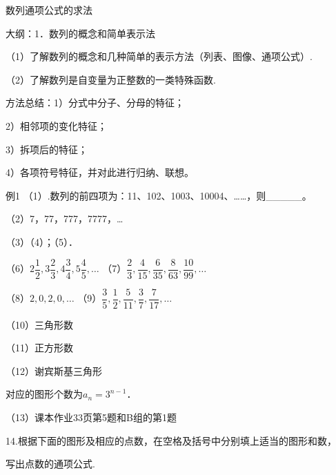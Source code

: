 
数列通项公式的求法\par
大纲：1．数列的概念和简单表示法\par
（1）了解数列的概念和几种简单的表示方法（列表、图像、通项公式）.\par
（2）了解数列是自变量为正整数的一类特殊函数.\par
\par\bigskip{}\par
方法总结：1）分式中分子、分母的特征；\par
2）相邻项的变化特征；\par
3）拆项后的特征；\par
4）各项符号特征，并对此进行归纳、联想。\par
{}
例1  （1）.数列的前四项为：11、102、1003、10004、\ldots{}\ldots{}，则\_\_\_\_\_。\par
（2）7，77，777，7777，\ldots{}\par
（3）（4）；\qquad{}（5）．\par
（6）$2\dfrac12,3\dfrac23,4\dfrac34,5\dfrac45,\ldots$\qquad
（7）$\dfrac23,\dfrac4{15},\dfrac6{35},\dfrac8{63},\dfrac{10}{99},\ldots$\par
（8）$2,0,2,0,\ldots$\qquad
（9）$\dfrac35,\dfrac12,\dfrac5{11},\dfrac37,\dfrac7{17},\ldots$\par
（10）三角形数\par
（11）正方形数\par
（12）谢宾斯基三角形\par
{}\par
对应的图形个数为$a_n=3^{n-1}$．\par
（13）课本作业33页第5题和B组的第1题\par
14.根据下面的图形及相应的点数，在空格及括号中分别填上适当的图形和数，\par
写出点数的通项公式.\par
